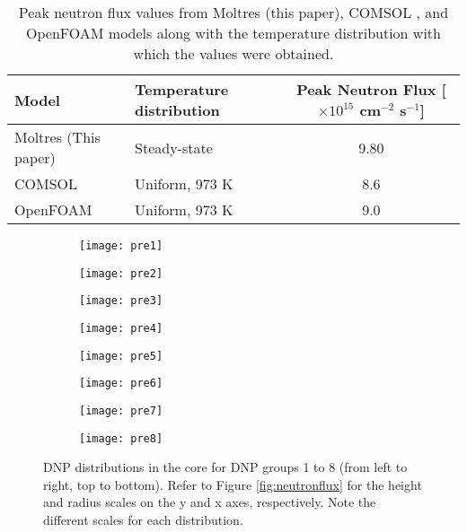 \begin{table}[b!]
	\centering
	\caption{Peak neutron flux values from Moltres (this paper), COMSOL
	\cite{fiorina_molten_2013}, and OpenFOAM \cite{aufiero_development_2014}
	models along with the temperature distribution with which the values were
	obtained.}
	\begin{tabular}{l l S}
		\toprule
		{Model} & {Temperature distribution} & {Peak Neutron Flux [$\times 10^{15}$ cm$^{-2}$ s$^{-1}$]}
		\\
		\midrule
		{Moltres (This paper)} & {Steady-state} & 9.80\\
		{COMSOL} & {Uniform, 973 K} & 8.6 \\
		{OpenFOAM} & {Uniform, 973 K} & 9.0 \\
		\bottomrule
	\end{tabular}
	\label{table:peak-flux}
\end{table}

\begin{figure}[t!]
    \centering
    \begin{subfigure}[t]{.243\textwidth}
        \centering
        \texttt{[image: pre1]}
    \end{subfigure}
    \begin{subfigure}[t]{.243\textwidth}
        \centering
        \texttt{[image: pre2]}
    \end{subfigure}
    \begin{subfigure}[t]{.243\textwidth}
        \centering
        \texttt{[image: pre3]}
    \end{subfigure}
    \begin{subfigure}[t]{.243\textwidth}
        \centering
        \texttt{[image: pre4]}
    \end{subfigure}
    \begin{subfigure}[t]{.243\textwidth}
        \centering
        \texttt{[image: pre5]}
    \end{subfigure}
    \begin{subfigure}[t]{.243\textwidth}
        \centering
        \texttt{[image: pre6]}
    \end{subfigure}
    \begin{subfigure}[t]{.243\textwidth}
        \centering
        \texttt{[image: pre7]}
    \end{subfigure}
    \begin{subfigure}[t]{.243\textwidth}
        \centering
        \texttt{[image: pre8]}
    \end{subfigure}
    \caption{\gls{DNP} distributions in the core for \gls{DNP} groups
    1 to 8 (from left to right, top to bottom). Refer to Figure \ref{fig:neutronflux} for the height and radius
    scales on the y and x axes, respectively. Note the different scales for
    each distribution.}
    \label{fig:dnp}
\end{figure}

